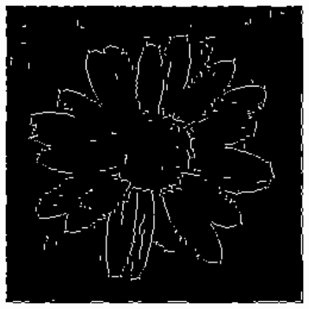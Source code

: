 \documentclass[a4paper]{report}
\begin{document}
\begin{figure}[H]
\begin{minipage}{.33\textwidth}
\end{minipage}%
\begin{minipage}{.33\textwidth}
  \centering
    \includegraphics[width=0.99\textwidth]{images/Canny/flowerFinal.png}
\end{minipage}%
\end{figure}
\end{document}
